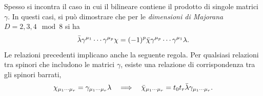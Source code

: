 Spesso si incontra il caso in cui il bilineare contiene il prodotto di singole matrici $\gamma$. In questi casi, si può dimostrare che per le \emph{dimensioni di Majorana} $D = 2,3,4\mod{8}$ si ha 
\begin{equation}
    \bar{\lambda}\gamma^{\mu_1}\cdots\gamma^{\mu_p}\chi = (-1)^p\bar{\chi}\gamma^{\mu_p}\cdots\gamma^{\mu_1}\lambda.
\end{equation}
Le relazioni precedenti implicano anche la seguente regola. Per qualsiasi relazioni tra spinori che includono le matrici $\gamma$, esiste una relazione di corrispondenza tra gli spinori barrati,
\begin{equation}
    \chi_{\mu_1\cdots\mu_r} = \gamma_{\mu_1\cdots\mu_r}\lambda \quad\Longrightarrow\quad \bar{\chi}_{\mu_1\cdots\mu_r} = t_0t_r\bar{\lambda}\gamma_{\mu_1\cdots\mu_r}.
\end{equation}

